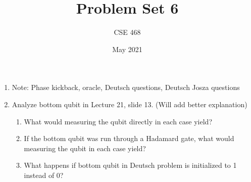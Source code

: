 \documentclass[12pt]{article}
\title{Problem Set 6}
\author{CSE 468}
\date{May 2021}
\begin{document}
\maketitle



\begin{enumerate}[font=\bfseries]

    \item Note: Phase kickback, oracle, Deutsch questions, Deutsch Josza questions
    \item Analyze bottom qubit in Lecture 21, slide 13. (Will add better explanation)
    \begin{enumerate}
        \item What would measuring the qubit directly in each case yield?
        \item If the bottom qubit was run through a Hadamard gate, what would measuring the qubit in each case yield?
    \item What happens if bottom qubit in Deutsch problem is initialized to 1 instead of 0?
    \end{enumerate}
    
    
\end{enumerate}
\end{document}

